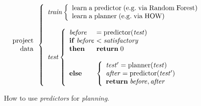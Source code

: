 \documentclass[conference]{IEEEtran}
\begin{document}
\begin{figure}[!t]
\small 
\[
\begin{array}{r}
\mathrm{project}\\
\mathrm{data}
\end{array} 
\left\{\begin{array}{l}\mathit{train}
        \left\{\begin{array}{l}
                \mathrm{learn\;a\;}\mathrm{predictor\;}\mathrm{(e.g.\;via \;Random\;Forest)}\\
                \mathrm{learn\;a\;}\mathrm{planner\;}\mathrm{(e.g.\;via \; HOW)}
              \end{array}\right.
       \\
      ~\\
\mathit{test}  
    \left\{\begin{array}{l@{~}l}
           \mathit{before}& =\mathrm{predictor}(\mathit{test})\\
           \mathrm{\bf if\;}\mathit{before} & <  \mathit{satisfactory}\\
           \mathrm{\bf then}  & \mathrm{{\bf return}\; 0}\\~\\
           \mathrm{\bf else} &
           \left\{
            \begin{array}{l}
                \mathit{test'} = \mathrm{planner}(\mathit{test})\\
                \mathit{after} =\mathrm{predictor}(\mathit{test'})\\ 
                \mathrm{{\bf return}\;} \mathit{before},\mathit{after}
            \end{array}
          \right.
   \end{array}\right.
\end{array} \right. 
\]
 
\caption{How to use {\em predictors} for {\em planning}.}\label{fig:work}
\end{figure}
\end{document}
